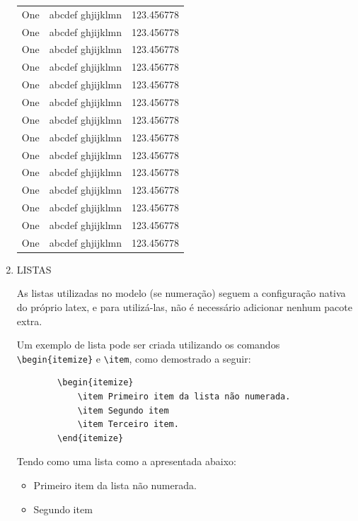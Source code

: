 \begin{enumerate}
\begin{longtable}{|l|l|c|}
	One & abcdef ghjijklmn & 123.456778 \\
	One & abcdef ghjijklmn & 123.456778 \\
	One & abcdef ghjijklmn & 123.456778 \\
	One & abcdef ghjijklmn & 123.456778 \\
	One & abcdef ghjijklmn & 123.456778 \\
	One & abcdef ghjijklmn & 123.456778 \\
	One & abcdef ghjijklmn & 123.456778 \\
	One & abcdef ghjijklmn & 123.456778 \\
	One & abcdef ghjijklmn & 123.456778 \\
	One & abcdef ghjijklmn & 123.456778 \\
	One & abcdef ghjijklmn & 123.456778 \\
	One & abcdef ghjijklmn & 123.456778 \\
	One & abcdef ghjijklmn & 123.456778 \\
	One & abcdef ghjijklmn & 123.456778 \\
\end{longtable}
	
	\item \MakeUppercase{Listas}

	As listas utilizadas no modelo (se numeração) seguem a configuração nativa do próprio latex, e para utilizá-las, não é necessário adicionar nenhum pacote extra.

	Um exemplo de lista pode ser criada utilizando os comandos \verb|\begin{itemize}| e \verb|\item|, como demostrado a seguir:

	\begin{verbatim}
		\begin{itemize}
			\item Primeiro item da lista não numerada.
			\item Segundo item
			\item Terceiro item.
		\end{itemize}
	\end{verbatim}

	Tendo como uma lista como a apresentada abaixo:

	\begin{itemize}
		\item Primeiro item da lista não numerada.
		\item Segundo item
	\end{itemize}


\end{enumerate}
